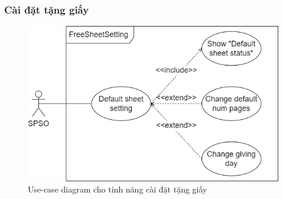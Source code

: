 \subsubsection{Cài đặt tặng giấy}
\begin{figure}[H]
    \begin{center}
        \includegraphics[width=1\textwidth]{Images/Requirement Elicitation/FreeSheetSetting_Use-case.png}
        \caption{Use-case diagram cho tính năng cài đặt tặng giấy}
        \label{fig:arch}
    \end{center}
\end{figure}
